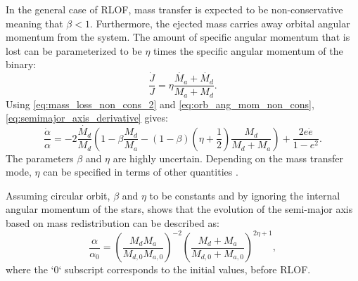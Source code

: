 In the general case of RLOF, mass transfer is expected to be non-conservative meaning that  $\beta < 1$. Furthermore,
the ejected mass carries away orbital angular momentum from the system. The amount of specific angular momentum that is lost can be parameterized to be $\eta$ times the specific angular momentum of the binary:
\begin{equation}\label{eq:orb_ang_mom_non_cons}
    \frac{\dot{J}}{J} = \eta \frac{\dot{M_{a}} + \dot{M_{d}}}{M_{a} + M_{d}}.
\end{equation}
Using \cref{eq:mass_loss_non_cons_2} and \cref{eq:orb_ang_mom_non_cons}, \cref{eq:semimajor_axis_derivative} gives:
\begin{equation}\label{eq:orb_ang_momen_derivative_non_cons}
    \frac{\dot{\alpha}}{\alpha}= -2\frac{\dot{M_{d}}}{M_{d}} \left( 1- \beta\frac{M_d}{M_a} - (1-\beta)(\eta + \frac{1}{2}) \frac{M_d}{M_d + M_a}  \right)  + \frac{2e \dot{e}}{1-e^2}.
\end{equation}  
The parameters $\beta$ and $\eta$ are highly uncertain. Depending on the mass transfer mode, $\eta$ can be specified in terms of other quantities \citep{postnov2014evolution}.

Assuming circular orbit, $\beta$ and $\eta$ to be constants and by ignoring the internal angular momentum of the stars, \cite{portegies1995formation} shows that the evolution of the semi-major axis based on mass redistribution can be described as:
\begin{equation}\label{eq:semimajor_axis_no_cons}
    \frac{\alpha}{\alpha_{0}} = \left (\frac{M_{d} M_{a}}{M_{d,0} M_{a,0}} \right)^{-2} \left (\frac{M_{d} + M_{a}}{M_{d,0}+M_{a,0}} \right)^{2\eta +1},
\end{equation}    
where the `0` subscript corresponds to the initial values, before RLOF.
    




